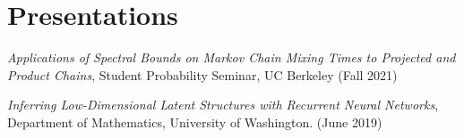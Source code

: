 \section{\sc Presentations}




\emph{Applications of Spectral Bounds on Markov Chain Mixing Times to Projected and Product Chains}, Student Probability Seminar, UC Berkeley (Fall 2021)

\emph{Inferring Low-Dimensional Latent Structures with Recurrent Neural Networks}, Department of Mathematics, University of Washington.  (June 2019)


\endinput